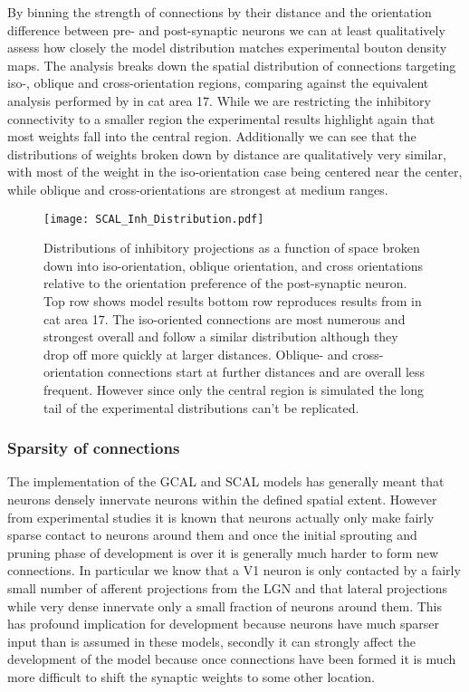 By binning the strength of connections by their distance and the
orientation difference between pre- and post-synaptic neurons we can
at least qualitatively assess how closely the model distribution
matches experimental bouton density maps. The analysis breaks down the
spatial distribution of connections targeting iso-, oblique and
cross-orientation regions, comparing against the equivalent analysis
performed by \cite{Kisvarday1997a} in cat area 17. While we are
restricting the inhibitory connectivity to a smaller region the
experimental results highlight again that most weights fall into the
central region. Additionally we can see that the distributions of
weights broken down by distance are qualitatively very similar, with
most of the weight in the iso-orientation case being centered near the
center, while oblique and cross-orientations are strongest at medium
ranges.

\begin{figure}
	\centering
        \texttt{[image: SCAL\_Inh\_Distribution.pdf]}
	\caption[Spatial and orientation distribution of the lateral
      inhibitory weights in SCAL.]{Distributions of inhibitory
      projections as a function of space broken down into
      iso-orientation, oblique orientation, and cross orientations
      relative to the orientation preference of the post-synaptic
      neuron. Top row shows model results bottom row reproduces
      results from \cite{Kisvarday1997a} in cat area 17. The
      iso-oriented connections are most numerous and strongest overall
      and follow a similar distribution although they drop off more
      quickly at larger distances. Oblique- and cross-orientation
      connections start at further distances and are overall less
      frequent. However since only the central region is simulated the
      long tail of the experimental distributions can't be
      replicated.}
	\label{LatORDist}
\end{figure}

\subsubsection*{Sparsity of connections}

The implementation of the GCAL and SCAL models has generally meant
that neurons densely innervate neurons within the defined spatial
extent. However from experimental studies it is known that neurons
actually only make fairly sparse contact to neurons around them and
once the initial sprouting and pruning phase of development is over it
is generally much harder to form new connections. In particular we
know that a V1 neuron is only contacted by a fairly small number of
afferent projections from the LGN and that lateral projections while
very dense innervate only a small fraction of neurons around
them. This has profound implication for development because neurons
have much sparser input than is assumed in these models, secondly it
can strongly affect the development of the model because once
connections have been formed it is much more difficult to shift the
synaptic weights to some other location.

